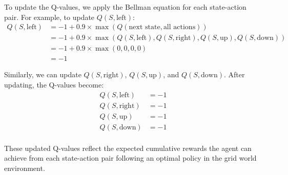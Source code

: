 \documentclass{article}
\begin{document}
To update the Q-values, we apply the Bellman equation for each state-action pair. For example, to update $Q(S, \text{left})$:
\[
\begin{aligned}
Q(S, \text{left}) &= -1 + 0.9 \times \max(Q(\text{next state}, \text{all actions})) \\
&= -1 + 0.9 \times \max(Q(S, \text{left}), Q(S, \text{right}), Q(S, \text{up}), Q(S, \text{down})) \\
&= -1 + 0.9 \times \max(0, 0, 0, 0) \\
&= -1
\end{aligned}
\]

Similarly, we can update $Q(S, \text{right})$, $Q(S, \text{up})$, and $Q(S, \text{down})$. After updating, the Q-values become:
\[
\begin{aligned}
Q(S, \text{left}) &= -1 \\
Q(S, \text{right}) &= -1 \\
Q(S, \text{up}) &= -1 \\
Q(S, \text{down}) &= -1 \\
\end{aligned}
\]

These updated Q-values reflect the expected cumulative rewards the agent can achieve from each state-action pair following an optimal policy in the grid world environment.
\end{document}
